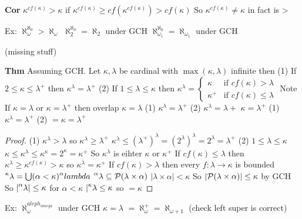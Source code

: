 \textbf{Cor} $\kappa^{cf(\kappa)}>\kappa$
if $\kappa^{cf(\kappa)}\geq cf(\kappa^{cf(\kappa)}) > cf(\kappa)$
So $\kappa^{cf(\kappa)} \neq \kappa$ in fact is >

Ex:
$\aleph_\omega ^ {\aleph_0} > \aleph_\omega$
$\aleph_2 ^ {\aleph_0} = \aleph_2$ under GCH
$\aleph_{\omega_1}^{\aleph_0} = \aleph_{\omega_1}$ under GCH


(missing stuff)

\textbf{Thm} Assuming GCH. Let $\kappa, \lambda$ be cardinal with $\max(\kappa,\lambda)$ infinite then
(1) If $2 \leq \kappa \leq \lambda^+$ then $\kappa^\lambda = \lambda^+$
(2) If $1 \leq \lambda \leq \kappa$ then $\kappa^\lambda =\begin{cases} \kappa & \text{if } cf(\kappa) > \lambda \\ \kappa^+ & \text{if } cf(\kappa) \leq \lambda \end{cases}$
Note If $\kappa = \lambda$ or $\kappa  = \lambda^+$ then
overlap $\kappa = \lambda$ (1) $\kappa^\lambda = \lambda^+$ (2) $\kappa^\lambda = \lambda+$
$\kappa=\lambda^+$ (1) $\kappa^\lambda = \lambda^+$ (2) $= \kappa = \lambda^+$

\begin{proof}
(1) $\kappa^\lambda > \lambda$ so $\kappa^\lambda \geq \lambda^+$
    $\kappa^\lambda \leq (\lambda^+)^\lambda = (2^\lambda)^\lambda = 2^\lambda = \lambda^+$
(2) $1 \leq \lambda \leq \kappa$
    $\kappa \leq \kappa^\lambda \leq \kappa^\kappa = 2^\kappa = \kappa^+$
    So $\kappa^\lambda$ is eihter $\kappa$ or $\kappa^+$
    If $cf(\kappa) \leq \lambda$ then $\kappa^\lambda \geq \kappa^{cf(\kappa)} > \kappa$ so $\kappa^\lambda = \kappa^+$
    If $cf(\kappa) > \lambda$ then every $f: \lambda \rightarrow \kappa$ is bounded
    $\leftsuperscript{\lambda}{\kappa} = \bigcup(\alpha<\kappa) \leftsuperscript{lambda}{\alpha}$
    $\leftsuperscript{\lambda}{\alpha} \subseteq \PP(\lambda \times \alpha)$
    $|\lambda \times \alpha| < \kappa$
    So $|\mathcal{P}(\lambda \times \alpha)| \leq \kappa$ by GCH
    So $|\leftsuperscript{\lambda}{\alpha}| \leq \kappa$ for $\alpha < \kappa$
    $|\leftsuperscript{\lambda}{\kappa} \leq \kappa$ so $= \kappa$
\end{proof}

Ex: $\aleph_\omega^{aleph_{omega}}$ under GCH
$\kappa = \lambda$
$=\aleph_\omega^+=\aleph_{\omega+1}$
(check left super is correct)